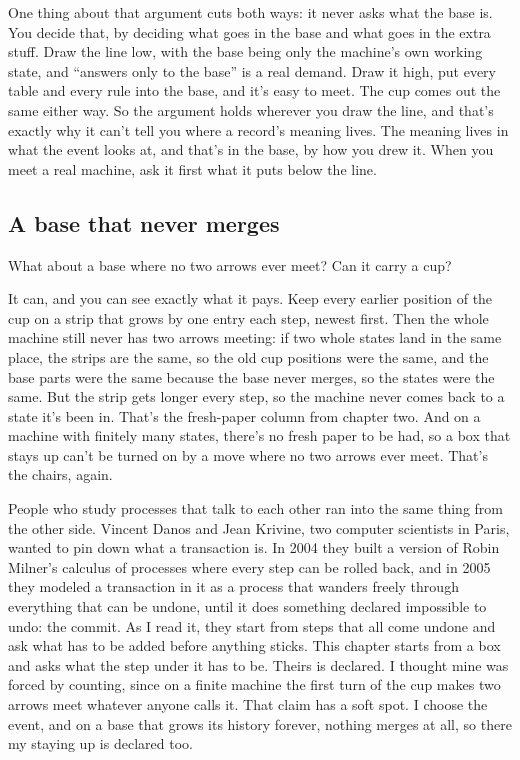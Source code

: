 \documentclass[11pt,twoside]{article}
\theoremstyle{thielethm}
\theoremstyle{thieledef}
\theoremstyle{thieledef}
\theoremstyle{thieledef}
\theoremstyle{thielethm}
\theoremstyle{thieleobs}
\theoremstyle{thielethm}
\begin{document}
One thing about that argument cuts both ways: it never asks what the base is. You decide that, by deciding what goes in the base and what goes in the extra stuff. Draw the line low, with the base being only the machine's own working state, and ``answers only to the base'' is a real demand. Draw it high, put every table and every rule into the base, and it's easy to meet. The cup comes out the same either way. So the argument holds wherever you draw the line, and that's exactly why it can't tell you where a record's meaning lives. The meaning lives in what the event looks at, and that's in the base, by how you drew it. When you meet a real machine, ask it first what it puts below the line.

\subsection{A base that never merges}

What about a base where no two arrows ever meet? Can it carry a cup?

It can, and you can see exactly what it pays. Keep every earlier position of the cup on a strip that grows by one entry each step, newest first. Then the whole machine still never has two arrows meeting: if two whole states land in the same place, the strips are the same, so the old cup positions were the same, and the base parts were the same because the base never merges, so the states were the same. But the strip gets longer every step, so the machine never comes back to a state it's been in. That's the fresh-paper column from chapter two. And on a machine with finitely many states, there's no fresh paper to be had, so a box that stays up can't be turned on by a move where no two arrows ever meet. That's the chairs, again.

People who study processes that talk to each other ran into the same thing from the other side. Vincent Danos and Jean Krivine, two computer scientists in Paris, wanted to pin down what a transaction is. In 2004 they built a version of Robin Milner's calculus of processes where every step can be rolled back, and in 2005 they modeled a transaction in it as a process that wanders freely through everything that can be undone, until it does something declared impossible to undo: the commit. As I read it, they start from steps that all come undone and ask what has to be added before anything sticks. This chapter starts from a box and asks what the step under it has to be. Theirs is declared. I thought mine was forced by counting, since on a finite machine the first turn of the cup makes two arrows meet whatever anyone calls it. That claim has a soft spot. I choose the event, and on a base that grows its history forever, nothing merges at all, so there my staying up is declared too.
\end{document}
